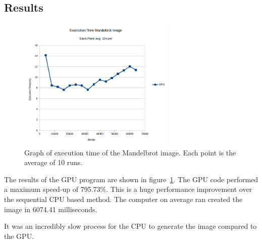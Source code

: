 \documentclass[letterpaper,twocolumn, 11pt]{article}
\begin{document}
\subsection{Results}
\begin{figure}
  \centering
  \includegraphics[width=7.5cm]{graph.png}
  \caption{Graph of execution time of the Mandelbrot image. Each point is the average of 10 runs.}
  \label{fig:graph}
\end{figure}

The results of the GPU program are shown in figure~\ref{fig:graph}. The GPU code performed a maximum speed-up of 795.73\%. This is a huge performance improvement over the sequential CPU based method. The computer on average ran created the image in 6074.41 milliseconds.

It was an incredibly slow process for the CPU to generate the image compared to the GPU.
\end{document}

